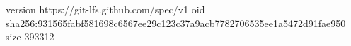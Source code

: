 version https://git-lfs.github.com/spec/v1
oid sha256:931565fabf581698c6567ee29c123c37a9acb7782706535ee1a5472d91fae950
size 393312
